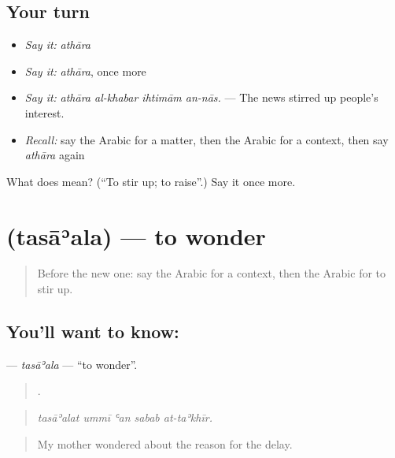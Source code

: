 \subsection*{Your turn}
\begin{itemize}
\raggedright
  \item \emph{Say it:} \emph{athāra}
  \item \emph{Say it:} \emph{athāra}, once more
  \item \emph{Say it:} \emph{athāra al-khabar ihtimām an-nās.} — The news stirred up people's interest.
  \item \emph{Recall:} say the Arabic for a matter, then the Arabic for a context, then say \emph{athāra} again
\end{itemize}

\begin{tcolorbox}[breakable,colback=teal!4,colframe=teal!35!black,title={Before you move on}]
What does  mean? (\textquotedblleft{}To stir up; to raise\textquotedblright{}.) Say it once more.
\end{tcolorbox}
\section[\texorpdfstring{\ar{تساءل} (tasāʾala)}{تساءل (tasāʾala)}]{ (tasāʾala) — to wonder}

\label{lesson:AR-C361-tasaala}



\begin{quote}
Before the new one: say the Arabic for a context, then the Arabic for to stir up.
\end{quote}

\subsection*{You'll want to know: }
\textbf{} — \emph{tasāʾala} — \textquotedblleft{}to wonder\textquotedblright{}.

\begin{quote}
    .
\end{quote}

\begin{quote}
\emph{tasāʾalat ummī ʿan sabab at-taʾkhīr.}
\end{quote}

\begin{quote}
My mother wondered about the reason for the delay.
\end{quote}

